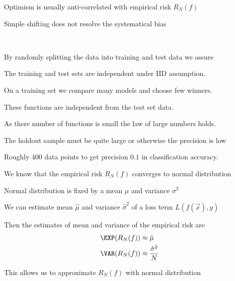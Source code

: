\documentclass[landscape,footrule]{foils}
\begin{document}

\vspace*{-0.5cm}
Optimism is usually anti-correlated with empirical risk $R_N(f)$   
\begin{triangles}
\item Simple shifting does not resolve the systematical bias  
\end{triangles}




\

By randomly splitting the data into training and test data we assure
\begin{triangles}
\item The training and test sets are independent under IID assumption.
\item On a training set we compare many models and  choose few winners. 
\item These functions are independent from the test set data.
\item As there number of functions is small the law of large numbers holds. 
\end{triangles}




The holdout sample must be quite large or otherwise the precision is low
\begin{triangles}
\item Roughly $400$ data points to get precision $0.1$ in classification accuracy.
\end{triangles}


We know that the empirical risk $R_N(f)$ converges to normal distribution
\begin{triangles}
\item Normal distribution is fixed by a mean $\mu$ and variance $\sigma^2$
\item We can estimate mean $\hat{\mu}$ and variance $\hat{\sigma}^2$ of a loss term $L(f(\vec{x}), y)$ 
\item Then the estimates of mean and variance of the empirical risk are
\begin{align*}
\EXP(R_N(f))&\approx \hat{\mu}\\
\VAR(R_N(f))&\approx \frac{\hat{\sigma}^2}{N}
\end{align*}
\item This allows us to approximate $R_N(f)$ with normal distribution 
\end{triangles}
\end{document}
